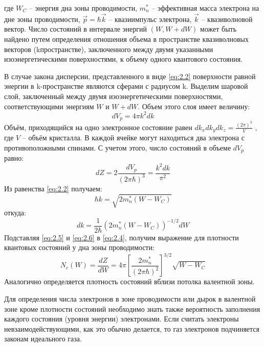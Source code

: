 где $W_C$ – энергия дна зоны проводимости, $m_n^*$ –  эффективная масса электрона на дне зоны проводимости, $\vec{p} =
\hbar \vec{k}$ – квазиимпульс электрона, $\vec{k}$ – квазиволновой вектор. Число состояний в интервале энергий $(W, W+dW)$ может быть найдено
путем определения отношения объема в пространстве квазиволновых векторов (kпространстве), заключенного между двумя
указанными изоэнергетическими поверхностями, к объему одного квантового состояния. 

В случае закона дисперсии, представленного в виде \eqref{eq:2.2} поверхности равной энергии в k-пространстве являются
сферами с радиусом k. Выделим шаровой слой, заключенный между двумя изоэнергетическими поверхностями, соответствующими
энергиям $W$ и $W+dW$. Объем этого слоя имеет величину: 
\begin{equation}
	dV_p = 4 \pi k^2 d k
	\label{eq:2.3}
\end{equation}
Объём, приходящийся на одно электронное состояние равен $dk_x dk_y dk_z = \frac{(2 \pi)^3}{V}$ , где $V$ – объём
кристалла. В каждой ячейке могут находиться два электрона с противоположными спинами. С учетом этого, число состояний в
объеме $dV_p$ равно: 
\begin{equation}
	d Z=2 \frac{d V_{p}}{(2 \pi \hbar)^{3}}=\frac{k^{2} d k}{\pi^{2}}
	\label{eq:2.4}
\end{equation}
Из равенства \eqref{eq:2.2} получаем: 
\begin{equation}
	\hbar k=\sqrt{2 m_{n}^{*}\left(W-W_{C}\right)}
	\label{eq:2.5}
\end{equation}
откуда:
\begin{equation}
	d k=\frac{1}{2 \hbar}\left(2 m_{n}^{*}\left(W-W_{C}\right)\right)^{-1 / 2} d W
	\label{eq:2.6}
\end{equation}
Подставляя \eqref{eq:2.5} и \eqref{eq:2.6} в \eqref{eq:2.4}, получим выражение для плотности квантовых состояний у дна зоны
проводимости:
\begin{equation}
	N_{c}(W)=\frac{d Z}{d W}=4 \pi\left[\frac{2 m_{n}^{*}}{(2 \pi \hbar)^{2}}\right]^{3 / 2} \sqrt{W-W_{C}}
	\label{eq:2.7}
\end{equation} 
Аналогично определяется плотность состояний вблизи потолка валентной зоны.

Для определения числа электронов в зоне проводимости или дырок в валентной зоне кроме плотности состояний необходимо
знать также вероятность заполнения каждого состояния (уровня энергии) электронами. Если считать электроны
невзаимодействующими, как это обычно делается, то газ электронов подчиняется законам идеального газа. 

